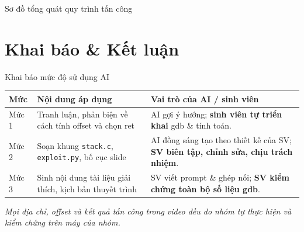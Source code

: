 \documentclass[aspectratio=169,10pt]{beamer}
\begin{document}
\begin{frame}{Sơ đồ tổng quát quy trình tấn công}
  \centering
\end{frame}

\section{Khai báo \& Kết luận}
\begin{frame}{Khai báo mức độ sử dụng AI}
  \footnotesize
  \begin{table}
    \begin{tabular}{p{1.3cm} p{5.3cm} p{4.6cm}}
      \toprule
      \textbf{Mức} & \textbf{Nội dung áp dụng} & \textbf{Vai trò của AI / sinh viên} \\
      \midrule
      Mức 1 & Tranh luận, phản biện về cách tính offset và chọn ret &
        AI gợi ý hướng; \textbf{sinh viên tự triển khai} gdb \& tính toán. \\
      \addlinespace
      Mức 2 & Soạn khung \texttt{stack.c}, \texttt{exploit.py}, bố cục slide &
        AI đồng sáng tạo theo thiết kế của SV; \textbf{SV biên tập, chỉnh sửa, chịu trách nhiệm}. \\
      \addlinespace
      Mức 3 & Sinh nội dung tài liệu giải thích, kịch bản thuyết trình &
        SV viết prompt \& ghép nối; \textbf{SV kiểm chứng toàn bộ số liệu gdb}. \\
      \bottomrule
    \end{tabular}
  \end{table}
  \textit{Mọi địa chỉ, offset và kết quả tấn công trong video đều do nhóm tự thực hiện và kiểm chứng trên máy của nhóm.}
\end{frame}
\end{document}
